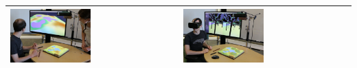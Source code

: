 \documentclass[prodmode,acmtochi]{acmsmall} %
\begin{document}
\begin{table}
{\begin{tabular}{m{} m{}}
%
\includegraphics[width=0.49\textwidth]{images/immersive/sculpting_landforms_3.png} &
\includegraphics[width=0.49\textwidth]{images/immersive/trees_with_oculus_1.png}\\
%
\bottomrule
\end{tabular}}
\label{table:tl_vr} 
\end{table}

%
\end{document}
